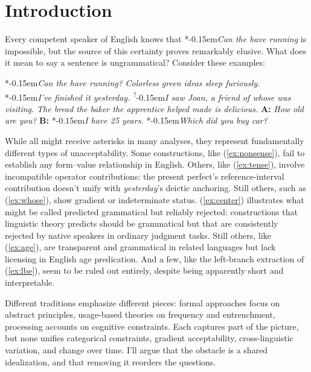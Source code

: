 \documentclass[12pt,letterpaper]{article}
\newcommand{\mention}[1]{\textit{#1}}
\newcommand{\judgesep}{\kern-0.15em}
\newcommand{\ungram}[1]{*\judgesep#1}
\newcommand{\marg}[1]{\textsuperscript{?}\judgesep#1}
\begin{document}
\newpage
\section*{Introduction}

Every competent speaker of English knows that \ungram{\mention{Can the have running}} is impossible, but the source of this certainty proves remarkably elusive. What does it mean to say a sentence is ungrammatical? Consider these examples:

\ea \label{ex:starting-stars}
\ea\label{ex:nonsense} \ungram{\mention{Can the have running?}}
\ex\label{ex:colorless-grammatica} \mention{Colorless green ideas sleep furiously.} \autocite{chomsky1957}
\ex\label{ex:tense} \ungram{\mention{I've finished it yesterday.}}
\ex\marg{\mention{I saw Joan, a friend of whose was visiting.}}\label{ex:whose} 
\ex\label{ex:center} \mention{The bread the baker the apprentice helped made is delicious.}
\ex\label{ex:age} \textbf{A:} \mention{How old are you?} \textbf{B:} \ungram{\mention{I have 25 years.}}
\ex\label{ex:lbe} \ungram{\mention{Which did you buy car?}}
\z\z

While all might receive asterisks in many analyses, they represent fundamentally different types of unacceptability. Some constructions, like (\ref{ex:nonsense}), fail to establish any form--value relationship in English. Others, like (\ref{ex:tense}), involve incompatible operator contributions: the present perfect's reference-interval contribution doesn't unify with \mention{yesterday}'s deictic anchoring. Still others, such as (\ref{ex:whose}), show gradient or indeterminate status. (\ref{ex:center}) illustrates what might be called predicted grammatical but reliably rejected: constructions that linguistic theory predicts should be grammatical but that are consistently rejected by native speakers in ordinary judgment tasks. Still others, like (\ref{ex:age}), are transparent and grammatical in related languages but lack licensing in English age predication. And a few, like the left-branch extraction of (\ref{ex:lbe}), seem to be ruled out entirely, despite being apparently short and interpretable.

Different traditions emphasize different pieces: formal approaches focus on abstract principles, usage-based theories on frequency and entrenchment, processing accounts on cognitive constraints. Each captures part of the picture, but none unifies categorical constraints, gradient acceptability, cross-linguistic variation, and change over time. I'll argue that the obstacle is a shared idealization, and that removing it reorders the questions.
\end{document}

